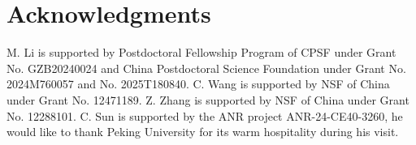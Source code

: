 \documentclass[11pt,reqno]{article}
\numberwithin{equation}{section}
\begin{document}
\begin{appendices}
    
\end{appendices}


\section*{Acknowledgments}
\normalfont
M. Li is supported by Postdoctoral Fellowship Program of CPSF under Grant No. GZB20240024 and China Postdoctoral Science Foundation under Grant No. 2024M760057 and No. 2025T180840. 
C. Wang is supported by NSF of China under Grant No. 12471189. 
Z. Zhang is supported by NSF of China under Grant No. 12288101.	C. Sun is supported by the ANR project ANR-24-CE40-3260, he would like to thank Peking University for its warm hospitality during his visit.
\end{document}
